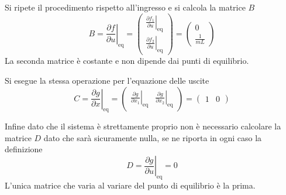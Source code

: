 Si ripete il procedimento rispetto all'ingresso e si calcola la matrice $B$
$$
B = \left.\frac{\partial f }{\partial u}\right|_{\text{eq}} =
\begin{pmatrix}
 \left.\frac{\partial f_1}{\partial u}\right|_{\text{eq}} \\
 \left.\frac{\partial f_2}{\partial u}\right|_{\text{eq}}
\end{pmatrix} =
\begin{pmatrix}
0 \\
\frac{1}{mL}
\end{pmatrix}
$$
La seconda matrice è costante e non dipende dai punti di equilibrio.

Si esegue la stessa operazione per l'equazione delle uscite
$$
C = \left.\frac{\partial g}{\partial x}\right|_{\text{eq}} =
\begin{pmatrix}
 \left.\frac{\partial g}{\partial x_1}\right|_{\text{eq}}  &
 \left.\frac{\partial g}{\partial x_2}\right|_{\text{eq}}
\end{pmatrix} =
\begin{pmatrix}
 1 & 0
\end{pmatrix}
$$

Infine dato che il sistema è strettamente proprio non è necessario calcolare la
matrice $D$ dato che sarà sicuramente nulla, se ne riporta in ogni caso la
definizione
$$
D = \left.\frac{\partial g}{\partial u}\right|_{\text{eq}} =
0
$$
L'unica matrice che varia al variare del punto di equilibrio è la prima.

